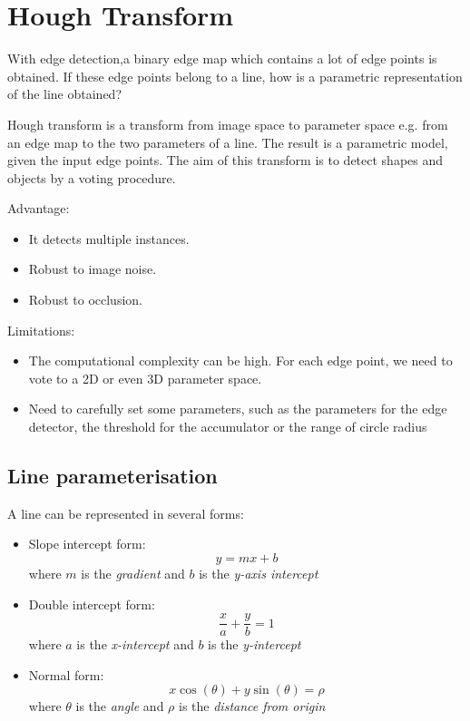 \documentclass{report}
\begin{document}
\chapter{Hough Transform}

With edge detection,a binary edge map which contains a lot of
edge points is obtained. If these edge points belong to a line, how is a parametric
representation of the line obtained? 

Hough transform is a transform from image space to parameter space e.g. from an
edge map to the two parameters of a line. The result is a parametric model,
given the input edge points. The aim of this transform is to detect shapes and
objects by a voting procedure.

Advantage:
\begin{itemize}
    \item It detects multiple instances.
    \item Robust to image noise.
    \item Robust to occlusion.
\end{itemize}

Limitations:
\begin{itemize}
    \item The computational complexity can be high. For each edge point, we need to vote to
    a 2D or even 3D parameter space.
    \item Need to carefully set some parameters, such as the parameters for the edge
    detector, the threshold for the accumulator or the range of circle radius
\end{itemize}

\section{Line parameterisation}

A line can be represented in several forms:
\begin{itemize}
    \item Slope intercept form: 
    $$
        y = mx + b
    $$
    where $m$ is the \textit{gradient} and $b$ is the \textit{y-axis intercept}

    \item Double intercept form: 
    $$
        \frac{x}{a} + \frac{y}{b} = 1
    $$
    where $a$ is the \textit{x-intercept} and $b$ is the \textit{y-intercept} 

    \item Normal form: 
    $$
        x\cos(\theta) + y\sin(\theta) = \rho
    $$
    where $\theta$ is the \textit{angle} and $\rho$ is the \textit{distance from origin}  
\end{itemize}
\end{document}
